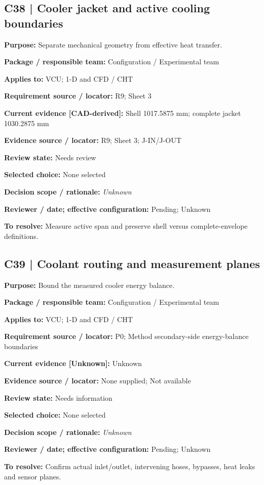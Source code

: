 \documentclass[11pt]{article}
\begin{document}
\par\noindent\begin{minipage}{\textwidth}\small\setlength{\parskip}{2pt}
\subsection*{C38 | Cooler jacket and active cooling boundaries}
\textbf{Purpose:} Separate mechanical geometry from effective heat transfer.\par
\textbf{Package / responsible team:} Configuration / Experimental team\par
\textbf{Applies to:} VCU; 1-D and CFD / CHT\par
\textbf{Requirement source / locator:} R9; Sheet 3\par
\textbf{Current evidence [CAD-derived]:} Shell 1017.5875 mm; complete jacket 1030.2875 mm\par
\textbf{Evidence source / locator:} R9; Sheet 3; J-IN/J-OUT\par
\textbf{Review state:} Needs review\par
\textbf{Selected choice:} None selected\par
\textbf{Decision scope / rationale:} \textit{Unknown}\par
\textbf{Reviewer / date; effective configuration:} Pending; Unknown\par
\textbf{To resolve:} Measure active span and preserve shell versus complete-envelope definitions.\par
\end{minipage}\par\vspace{5pt}
\par\noindent\begin{minipage}{\textwidth}\small\setlength{\parskip}{2pt}
\subsection*{C39 | Coolant routing and measurement planes}
\textbf{Purpose:} Bound the measured cooler energy balance.\par
\textbf{Package / responsible team:} Configuration / Experimental team\par
\textbf{Applies to:} VCU; 1-D and CFD / CHT\par
\textbf{Requirement source / locator:} P0; Method secondary-side energy-balance boundaries\par
\textbf{Current evidence [Unknown]:} Unknown\par
\textbf{Evidence source / locator:} None supplied; Not available\par
\textbf{Review state:} Needs information\par
\textbf{Selected choice:} None selected\par
\textbf{Decision scope / rationale:} \textit{Unknown}\par
\textbf{Reviewer / date; effective configuration:} Pending; Unknown\par
\textbf{To resolve:} Confirm actual inlet/outlet, intervening hoses, bypasses, heat leaks and sensor planes.\par
\end{minipage}\par\vspace{5pt}
\end{document}
